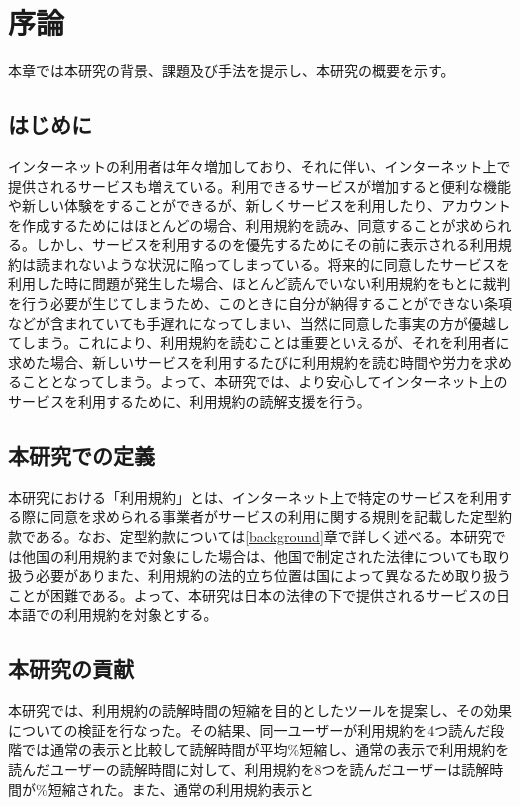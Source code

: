 \chapter{序論}
\label{introduction}

本章では本研究の背景、課題及び手法を提示し、本研究の概要を示す。

\section{はじめに}
\label{introduction:background}
インターネットの利用者は年々増加しており、それに伴い、インターネット上で提供されるサービスも増えている。利用できるサービスが増加すると便利な機能や新しい体験をすることができるが、新しくサービスを利用したり、アカウントを作成するためにはほとんどの場合、利用規約を読み、同意することが求められる。しかし、サービスを利用するのを優先するためにその前に表示される利用規約は読まれないような状況に陥ってしまっている。将来的に同意したサービスを利用した時に問題が発生した場合、ほとんど読んでいない利用規約をもとに裁判を行う必要が生じてしまうため、このときに自分が納得することができない条項などが含まれていても手遅れになってしまい、当然に同意した事実の方が優越してしまう。これにより、利用規約を読むことは重要といえるが、それを利用者に求めた場合、新しいサービスを利用するたびに利用規約を読む時間や労力を求めることとなってしまう。よって、本研究では、より安心してインターネット上のサービスを利用するために、利用規約の読解支援を行う。

\section{本研究での定義}
本研究における「利用規約」とは、インターネット上で特定のサービスを利用する際に同意を求められる事業者がサービスの利用に関する規則を記載した定型約款である。なお、定型約款については\ref{background}章で詳しく述べる。本研究では他国の利用規約まで対象にした場合は、他国で制定された法律についても取り扱う必要がありまた、利用規約の法的立ち位置は国によって異なるため取り扱うことが困難である。よって、本研究は日本の法律の下で提供されるサービスの日本語での利用規約を対象とする。

\section{本研究の貢献}
本研究では、利用規約の読解時間の短縮を目的としたツールを提案し、その効果についての検証を行なった。その結果、同一ユーザーが利用規約を4つ読んだ段階では通常の表示と比較して読解時間が平均\%短縮し、通常の表示で利用規約を読んだユーザーの読解時間に対して、利用規約を8つを読んだユーザーは読解時間が\%短縮された。また、通常の利用規約表示と

